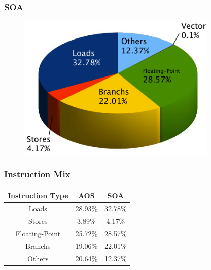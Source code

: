 \documentclass{beamer}
\begin{document}
\begin{frame}
	\frametitle{SOA}
	\begin{figure}
		\begin{center}
			\includegraphics[width=0.85\textwidth]{images/slides.april/instmxSOA.png}
		\end{center}
	\end{figure}
\end{frame}

\begin{frame}
\frametitle{Instruction Mix}
	\begin{table}
		\begin{center}
			\begin{tabular}{|c|cc|}
				\hline
				\textbf{Instruction Type} & \textbf{AOS} & \textbf{SOA} \\
				\hline
				\hline
				Loads & 28.93\% & 32.78\% \\
				Stores & 3.89\% & 4.17\% \\
				Floating-Point & 25.72\% & 28.57\% \\
				Branchs & 19.06\% & 22.01\% \\
				Others & 20.64\% & 12.37\% \\
				\hline
			\end{tabular}
		\end{center}
	\end{table}
\end{frame}
\end{document}
